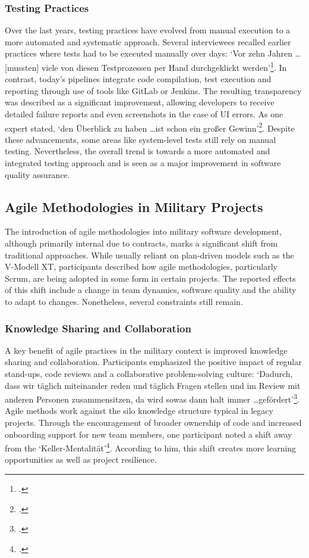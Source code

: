 \subsubsection{Testing Practices}
Over the last years, testing practices have evolved from manual execution to a more automated and systematic approach. Several interviewees recalled earlier practices where tests had to be executed manually over days: `Vor zehn Jahren \ldots [mussten] viele von diesen Testprozessen per Hand durchgeklickt werden'\footcite[72]{Interview22025}. In contrast, today's pipelines
integrate code compilation, test execution and reporting through use of tools like GitLab or Jenkins.
The resulting transparency was described as a significant improvement, allowing developers to receive detailed failure reports and even screenshots in the case of \ac{UI} errors. As one expert stated, `den Überblick zu haben \ldots ist schon ein großer Gewinn'\footcite[63]{Interview12025}.
Despite these advancements, some areas like system-level tests still rely on manual testing. Nevertheless, the overall trend is towards a more automated and integrated testing approach and is seen as a major improvement in software quality assurance.

\subsection{Agile Methodologies in Military Projects}
The introduction of agile methodologies into military software development, although primarily internal due to contracts, marks a significant shift from traditional approaches. While usually reliant on plan-driven models such as the V-Modell XT, participants described how agile methodologies, particularly Scrum, are being adopted in some form in certain projects.
The reported effects of this shift include a change in team dynamics, software quality and the ability to adapt to changes. Nonetheless, several constraints still remain.

\subsubsection{Knowledge Sharing and Collaboration}
A key benefit of agile practices in the military context is improved knowledge sharing and collaboration. Participants emphasized the positive impact of regular stand-ups, code reviews and a collaborative problem-solving culture: `Dadurch, dass wir täglich miteinander reden und täglich Fragen stellen und im Review mit anderen 
Personen zusammensitzen, da wird sowas dann halt immer \ldots gefördert'\footcite[79]{Interview32025}. Agile methods work against the silo knowledge structure typical in legacy projects. Through the encouragement of broader ownership of code and increased onboarding support for new team members, one participant noted a shift away from the `Keller-Mentalität'\footcite[70]{Interview22025}. According to him,
this shift creates more learning opportunities as well as project resilience.

